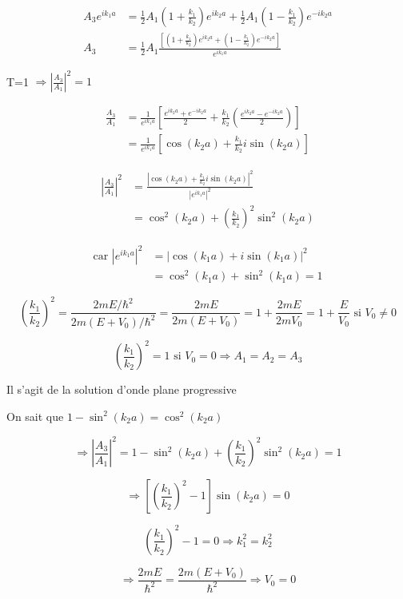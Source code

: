 \documentclass[12pt,a4paper]{article}
\begin{document}
\begin{align*}
A_3 e^{ik_1a} &= \frac{1}{2}A_1\left(1+\frac{k_1}{k_2}\right)e^{ik_2a} + \frac{1}{2}A_1\left(1-\frac{k_1}{k_2}\right)e^{-ik_2a} \\
A_3 &= \frac{1}{2}A_1\frac{\left[\left(1+\frac{k_1}{k_2}\right)e^{ik_2a} + \left(1-\frac{k_1}{k_2}\right)e^{-ik_2a}\right]}{e^{ik_1a}}
\end{align*}

 T=1 $\Rightarrow \left|\frac{A_3}{A_1}\right|^2 = 1$

\begin{align*}
\frac{A_3}{A_1} &= \frac{1}{e^{ik_1a}}\left[\frac{e^{ik_2a}+e^{-ik_2a}}{2} + \frac{k_1}{k_2}\left(\frac{e^{ik_2a}-e^{-ik_2a}}{2}\right)\right] \\
&= \frac{1}{e^{ik_1a}}\left[\cos(k_2a) + \frac{k_1}{k_2}i\sin(k_2a)\right]
\end{align*}

\begin{align*}
\left|\frac{A_3}{A_1}\right|^2 &= \frac{\left|\cos(k_2a) + \frac{k_1}{k_2}i\sin(k_2a)\right|^2}{|e^{ik_1a}|^2} \\
&= \cos^2(k_2a) + \left(\frac{k_1}{k_2}\right)^2\sin^2(k_2a)
\end{align*}

\begin{align*}
\text{car }|e^{ik_1a}|^2 &= |\cos(k_1a) + i\sin(k_1a)|^2 \\
&= \cos^2(k_1a) + \sin^2(k_1a) = 1
\end{align*}



\[
\left(\frac{k_1}{k_2}\right)^2 = \frac{2mE/\hbar^2}{2m(E+V_0)/\hbar^2} = \frac{2mE}{2m(E+V_0)} = 1+ \frac{2mE}{2mV_0} = 1+ \frac{E}{V_0} \text{ si } V_0 \neq 0
\]

\[
\left(\frac{k_1}{k_2}\right)^2 = 1 \text{ si } V_0 = 0 \Rightarrow A_1 = A_2 = A_3
\]

Il s'agit de la solution d'onde plane progressive

On sait que $1-\sin^2(k_2 a) = \cos^2(k_2 a)$

\[
\Rightarrow \left|\frac{A_3}{A_1}\right|^2 = 1-\sin^2(k_2 a) + \left(\frac{k_1}{k_2}\right)^2\sin^2(k_2 a) = 1
\]

\[
\Rightarrow \left[\left(\frac{k_1}{k_2}\right)^2 - 1\right]\sin(k_2 a) = 0
\]

\[
\left(\frac{k_1}{k_2}\right)^2 - 1 = 0 \Rightarrow k_1^2 = k_2^2
\]

\[
\Rightarrow \frac{2mE}{\hbar^2} = \frac{2m(E+V_0)}{\hbar^2} \Rightarrow V_0 = 0
\]
\end{document}
